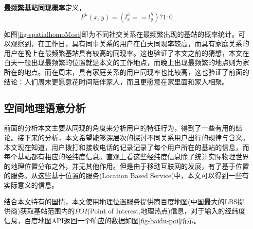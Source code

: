 \begin{definition}
    \label{spatial-homoMost-concept}
    \textbf{最频繁基站同现概率}定义，
    \begin{equation}
        P^{h}(x,y) = (l_x^h == l_y^h)? 1:0 
    \end{equation}
\end{definition}

如图\ref{fig-spatialhomoMost}即为不同社交关系在最频繁出现的基站的概率统计。可以观察到，在工作日，具有同事关系的用户在白天同现率较高，而具有家庭关系的用户在晚上在最频繁基站具有较高的同现率。这也验证了本文之前的猜想，本文在白天一般出现最频繁的位置就是本文的工作地点，而晚上出现最频繁的地点则为家所在的地点。而在周末，具有家庭关系的用户同现率也比较高，这也验证了前面的结论：人们周末更愿意花时间陪伴家人，而且更愿意在家里面和家人相聚。



\subsection{空间地理语意分析}

前面的分析本文主要从同现的角度来分析用户的特征行为，得到了一些有用的结论。接下来的分析，本文希望能够深层次的探讨不同关系用户出行的规律与含义。本文现在知道，用户拨打和接收电话的记录记录了每个用户所在的基站的信息，而每个基站都有相应的经纬度信息。直观上看这些经纬度信息除了统计实际物理世界的地理位置分布之外，并无其他作用。但是由于移动互联网的发展，有了基于位置的服务。从这些基于位置的服务(Location Based Service)中，本文可以得到一些有实际意义的信息。

结合本文特有的国情，本文使用地理位置服务提供商百度地图(中国最大的LBS提供商)获取基站范围内的$POI$(Point of Interest,地理热点)信息，对于输入的经纬度信息，百度地图API返回一个响应的数据如图\ref{fig-baidu-poi}所示。






